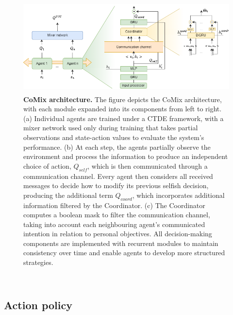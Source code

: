 \documentclass[a4paper,singleside,12pt]{report} %
\begin{document}
\begin{figure}
  \centering
  \includegraphics[height=5cm]{images/pipeline.png}
  
  \caption{ \textbf{CoMix architecture.} The figure depicts the CoMix architecture, with each module expanded into its components from left to right. (a) Individual agents are trained under a CTDE framework, with a mixer network used only during training that takes partial observations and state-action values to evaluate the system's performance. (b) At each step, the agents partially observe the environment and process the information to produce an independent choice of action, $Q_{self}$, which is then communicated through a communication channel. Every agent then considers all received messages to decide how to modify its previous selfish decision, producing the additional term $Q_{coord}$, which incorporates additional information filtered by the Coordinator. (c) The Coordinator computes a boolean mask to filter the communication channel, taking into account each neighbouring agent's communicated intention in relation to personal objectives. All decision-making components are implemented with recurrent modules to maintain consistency over time and enable agents to develop more structured strategies.}
  \label{fig:pipeline}
\end{figure}\

\subsection{Action policy}\label{action-policy}
\end{document}
